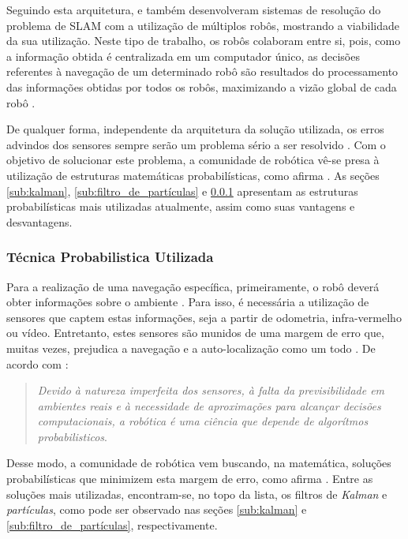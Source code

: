 			Seguindo esta arquitetura, \cite{neuralNetwork} e \cite{multiRobots} também desenvolveram sistemas de resolução do problema de SLAM com a utilização de múltiplos robôs, mostrando a viabilidade da sua utilização. Neste tipo de trabalho, os robôs colaboram entre si, pois, como a informação obtida é centralizada em um computador único, as decisões referentes à navegação de um determinado robô são resultados do processamento das informações obtidas por todos os robôs, maximizando a vizão global de cada robô \cite{redeComunicacaoIndustria}.

			De qualquer forma, independente da arquitetura da solução utilizada, os erros advindos dos sensores sempre serão um problema sério a ser resolvido \cite{circumventingAssociationSLAM}. Com o objetivo de solucionar este problema, a comunidade de robótica vê-se presa à utilização de estruturas matemáticas probabilísticas, como afirma \cite{circumventingAssociationSLAM}. As seções \ref{sub:kalman}, \ref{sub:filtro_de_partículas} e \ref{sub:prob_usada} apresentam as estruturas probabilísticas mais utilizadas atualmente, assim como suas vantagens e desvantagens.

		\subsubsection{Técnica Probabilistica Utilizada}
		\label{sub:prob_usada}

			Para a realização de uma navegação específica, primeiramente, o robô deverá obter informações sobre o ambiente \cite{roboticaIndustrial}. Para isso, é necessária a utilização de sensores que captem estas informações, seja a partir de odometria, infra-vermelho ou vídeo. Entretanto, estes sensores são munidos de uma margem de erro que, muitas vezes, prejudica a navegação e a auto-localização como um todo \cite{interacaoRoboAmbiente}. De acordo com \cite{circumventingAssociationSLAM}:

			\begin{quote}
				\textit{Devido à natureza imperfeita dos sensores, à falta da previsibilidade em ambientes reais e à necessidade de aproximações para alcançar decisões computacionais, a robótica é uma ciência que depende de algorítmos probabilisticos}.
			\end{quote}

			Desse modo, a comunidade de robótica vem buscando, na matemática, soluções probabilísticas que minimizem esta margem de erro, como afirma \cite{surveyLocalization}. Entre as soluções mais utilizadas, encontram-se, no topo da lista, os filtros de \textit{Kalman} e \textit{partículas}, como pode ser observado nas seções \ref{sub:kalman} e \ref{sub:filtro_de_partículas}, respectivamente.

